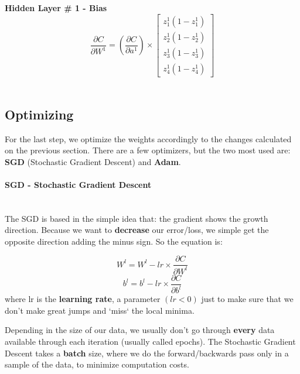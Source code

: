 \documentclass[12pt]{article}
\begin{document}
\textbf{Hidden Layer \# 1 - Bias}
\begin{equation}
\dfrac{\partial C}{\partial W^{1}} = \left(\dfrac{\partial C}{\partial a^{1}}\right)
\times
\begin{bmatrix}
z_{1}^{1} ( 1 - z_{1}^{1} )\\
z_{2}^{1} ( 1 - z_{2}^{1}) \\
z_{3}^{1} ( 1 - z_{3}^{1}) \\
z_{4}^{1} ( 1 - z_{4}^{1}) 
\end{bmatrix}
\end{equation} \mbox{} \\

\subsection{Optimizing}
For the last step, we optimize the weights accordingly to the changes calculated on the previous section. There are a few optimizers, but the two most used are: \textbf{SGD} (Stochastic Gradient Descent) and \textbf{Adam}.   \mbox{} \\

\paragraph{SGD - Stochastic Gradient Descent} \mbox{} \\
The SGD is based in the simple idea that: the gradient shows the growth direction. Because we want to \textbf{decrease} our error/loss, we simple get the opposite direction adding the minus sign. So the equation is:

\begin{equation}
    W^{l} = W^{l} - lr \times \dfrac{\partial C}{\partial W^{l}}
\end{equation}
\begin{equation}
    b^{l} = b^{l} - lr \times \dfrac{\partial C}{\partial b^{l}}
\end{equation}
where lr is the \textbf{learning rate}, a parameter $( lr < 0 )$ just to make sure that we don't make great jumps and `miss` the local minima.


Depending in the size of our data, we usually don't go through \textbf{every} data available through each iteration (usually called epochs). The Stochastic Gradient Descent takes a \textbf{batch} size, where we do the forward/backwards pass only in a sample of the data, to minimize computation costs.
\end{document}
